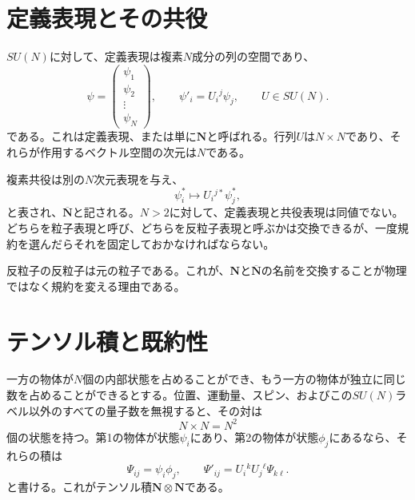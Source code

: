 \section{定義表現とその共役}

\(SU(N)\)に対して、定義表現は複素\(N\)成分の列の空間であり、
\begin{equation}
\psi=
\begin{pmatrix}
\psi_1\\
\psi_2\\
\vdots\\
\psi_N
\end{pmatrix},
\qquad
\psi'_i=U_i{}^j\psi_j,
\qquad
U\in SU(N).
\label{eq:l10-defining}
\end{equation}
である。これは定義表現、または単に\(\mathbf N\)と呼ばれる。行列\(U\)は\(N\times N\)であり、それらが作用するベクトル空間の次元は\(N\)である。

複素共役は別の\(N\)次元表現を与え、
\begin{equation}
\psi_i^*\longmapsto U_i{}^{j*}\psi_j^*,
\label{eq:l10-conjugate}
\end{equation}
と表され、\(\overline{\mathbf N}\)と記される。\(N>2\)に対して、定義表現と共役表現は同値でない。どちらを粒子表現と呼び、どちらを反粒子表現と呼ぶかは交換できるが、一度規約を選んだらそれを固定しておかなければならない。

\begin{classroomqa}
\end{classroomqa}

反粒子の反粒子は元の粒子である。これが、\(\mathbf N\)と\(\overline{\mathbf N}\)の名前を交換することが物理ではなく規約を変える理由である。

\section{テンソル積と既約性}

一方の物体が\(N\)個の内部状態を占めることができ、もう一方の物体が独立に同じ数を占めることができるとする。位置、運動量、スピン、およびこの\(SU(N)\)ラベル以外のすべての量子数を無視すると、その対は
\begin{equation}
N\times N=N^2
\label{eq:l10-product-count}
\end{equation}
個の状態を持つ。第1の物体が状態\(\psi_i\)にあり、第2の物体が状態\(\phi_j\)にあるなら、それらの積は
\begin{equation}
\Psi_{ij}=\psi_i\phi_j,
\qquad
\Psi'_{ij}=U_i{}^kU_j{}^\ell\Psi_{k\ell}.
\label{eq:l10-tensor-transform}
\end{equation}
と書ける。これがテンソル積\(\mathbf N\otimes\mathbf N\)である。

